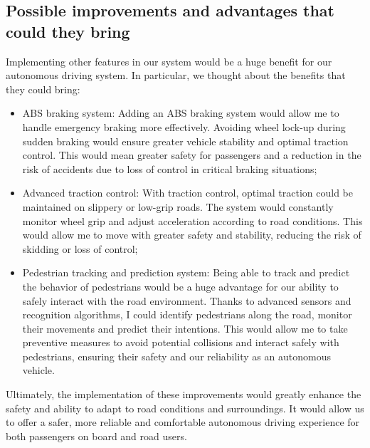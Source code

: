 \documentclass{article}
\begin{document}
\subsection{Possible improvements and advantages that could they bring}
Implementing other features in our system would be a huge benefit for our autonomous driving system. 
In particular, we thought about the benefits that they could bring:
\begin{itemize}
    \item ABS braking system: Adding an ABS braking system would allow me to handle emergency braking more effectively. Avoiding wheel lock-up during sudden braking would ensure greater vehicle stability and optimal traction control. This would mean greater safety for passengers and a reduction in the risk of accidents due to loss of control in critical braking situations;
    \item Advanced traction control: With traction control, optimal traction could be maintained on slippery or low-grip roads. The system would constantly monitor wheel grip and adjust acceleration according to road conditions. This would allow me to move with greater safety and stability, reducing the risk of skidding or loss of control;
    \item Pedestrian tracking and prediction system: Being able to track and predict the behavior of pedestrians would be a huge advantage for our ability to safely interact with the road environment. Thanks to advanced sensors and recognition algorithms, I could identify pedestrians along the road, monitor their movements and predict their intentions. This would allow me to take preventive measures to avoid potential collisions and interact safely with pedestrians, ensuring their safety and our reliability as an autonomous vehicle.
\end{itemize}
Ultimately, the implementation of these improvements would greatly enhance the safety and ability to adapt to 
road conditions and surroundings. It would allow us to offer a safer, more reliable and comfortable autonomous 
driving experience for both passengers on board and road users.

\printbibliography
\end{document}
